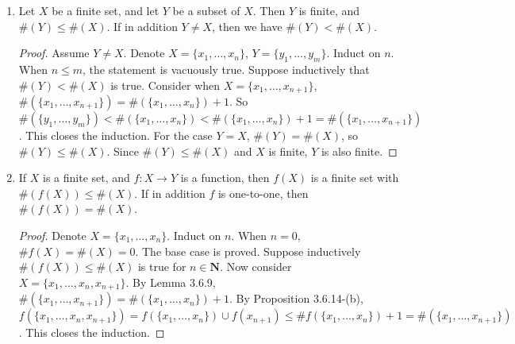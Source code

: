 \documentclass[12pt, letter]{article}
\begin{document}
\begin{enumerate}
\begin{proof}
        If $X$ and $Y$ are disjoint, by Lemma 3.6.9, we have 
        \begin{equation*}
            \begin{gathered}
                \#(X\cup Y-\{y_1\})=\#(X\cup Y)-1,\\
                \#((X\cup Y-\{y_1\}))=\#(X\cup Y-\{y_1\})-1,\\
                \vdots\\
                \#((X\cup Y-\{y_1\}-\cdots-\{y_{n-1}\})-\{y_n\})=\#(X\cup Y-\cdots-\{y_{n-1}\})-1.
            \end{gathered}
        \end{equation*}
        Sum these $n$ equations up, we have 
        \begin{equation*}
            \#(X)=\#((X\cup Y-\{y_1\}-\cdots-\{y_{n-1}\})-\{y_n\})=\#(X\cup Y)-\#(Y).
        \end{equation*}
        Thus, $\#(X\cup Y)=\#(X)+\#(Y)$.
    \end{proof}
    \item Let $X$ be a finite set, and let $Y$ be a subset of $X$. Then $Y$ is finite, and $\#(Y)\leq \#(X)$. If in addition $Y\ne X$, then we have $\#(Y)<\#(X)$.
    \begin{proof}
        Assume $Y\ne X$. Denote $X=\{x_1,\dotsc,x_n\}$, $Y=\{y_1,\dotsc, y_m\}$. Induct on $n$. When $n\leq m$, the statement is vacuously true. Suppose 
        inductively that $\#(Y)<\#(X)$ is true. Consider when $X=\{x_1,\dotsc,x_{n+1}\}$, $\#(\{x_1,\dotsc,x_{n+1}\})=\#(\{x_1,\dotsc,x_n\})+1$. So $\#(\{y_1,\dotsc,y_m\})< \#(\{x_1,\dotsc, x_n\})
        < \#(\{x_1,\dotsc, x_{n}\})+1=\#(\{x_1,\dotsc, x_{n+1}\})$. This closes the induction. For the case $Y=X$, $\#(Y)=\#(X)$, so $\#(Y)\leq \#(X)$. Since $\#(Y)\leq \#(X)$ and $X$ is finite, $Y$ is 
        also finite.
    \end{proof}
    \item If $X$ is a finite set, and $f:X\to Y$ is a function, then $f(X)$ is a finite set with $\#(f(X))\leq\#(X)$. If in addition $f$ is one-to-one, then $\#(f(X))=\#(X)$.
    \begin{proof}
        Denote $X=\{x_1,\dotsc,x_n\}$. Induct on $n$. When $n=0$, $\#f(X)=\#(X)=0$. The base case is proved. Suppose inductively $\#(f(X))\leq\#(X)$ is true for $n\in\mathbf{N}$. 
        Now consider $X=\{x_1,\dotsc,x_n,x_{n+1}\}$. By Lemma 3.6.9, $\#(\{x_1,\dotsc, x_{n+1}\})=\#(\{x_1,\dotsc, x_n\})+1$. By Proposition 3.6.14-(b),\\
         $f(\{x_1,\dotsc,x_n,x_{n+1}\})=f(\{x_1,\dotsc,x_n\})\cup f(x_{n+1})\leq \#f(\{x_1,\dotsc,x_n\})+1=\#(\{x_1,\dotsc,x_{n+1}\})$. This closes the induction.


\end{proof}
\end{enumerate}
\end{document}
